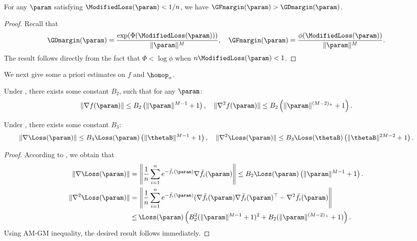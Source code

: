 \begin{lemma}\label{lem:relation_modified_margins}
    For any $\param$ satisfying $\ModifiedLoss(\param) < 1/n$, we have $\GFmargin (\param) > \GDmargin (\param)$.
\end{lemma}
\begin{proof}
    Recall that
    \begin{equation*}
        \GDmargin (\param) = \frac{\exp(\Phi(\ModifiedLoss(\param)))}{\| \param \|^M}, \quad \GFmargin (\param) = \frac{\phi(\ModifiedLoss(\param))}{\| \param \|^M}.
    \end{equation*}
    The result follows directly from the fact that $\Phi < \log \phi$ when $n \ModifiedLoss(\param) < 1$.
\end{proof}

We next give some a priori estimates on $f$ and $\homop_a$.
\begin{lemma}
\label{lem: Homogeneous constant}
Under , there exists some constant $B_2$, such that for any $\param$:
\begin{equation}
\label{eq: homogeneous-constant}
    \|\nabla f(\param ) \| \le B_2 \left( \|\param \|^{M-1} + 1 \right), \quad \| \nabla^2 f(\param )\| \le B_2 \left( \| \param \|^{(M-2)_+} + 1 \right).  
\end{equation}
\end{lemma}

\begin{lemma}
\label{lem:gradient_hessian_bound_L}
Under , there exists some constant $B_3$:
\begin{equation}
\label{eq: bound of gradient and hessian 2}
   \|\nabla \Loss (\param) \| \le B_3 \Loss (\param ) \left( \| \thetaB \|^{M-1} + 1 \right), \quad \| \nabla^2 \Loss (\param) \| \le B_3 \Loss ( \thetaB) \left( \| \thetaB \|^{2M - 2} + 1 \right).
\end{equation}
\end{lemma}
\begin{proof}
According to , we obtain that
\begin{align*}
    \| \nabla \Loss (\param) \| = \, & \left\| \frac{1}{n} \sum_{i=1}^n e^{-\bar f_i(\param )} \nabla \bar f_i(\param ) \right\| \le B_2 \Loss (\param ) \left( \|\param \|^{M-1} + 1 \right).\\ 
    \| \nabla^2 \Loss (\param) \| = \, & \left\| \frac{1}{n} \sum_{i=1}^n e^{-\bar f_i(\param )} (\nabla  \bar f_i(\param ) \nabla \bar f_i(\param )^\top -\nabla^2 \bar f_i(\param ) \right\| \\
    \le \, & \Loss (\param ) \left( B_2^2 (\|\param \|^{M-1} + 1)^2 + B_2 (\|\param \|^{(M-2)_+} + 1) \right).
\end{align*}
Using AM-GM inequality, the desired result follows immediately.
\end{proof}


